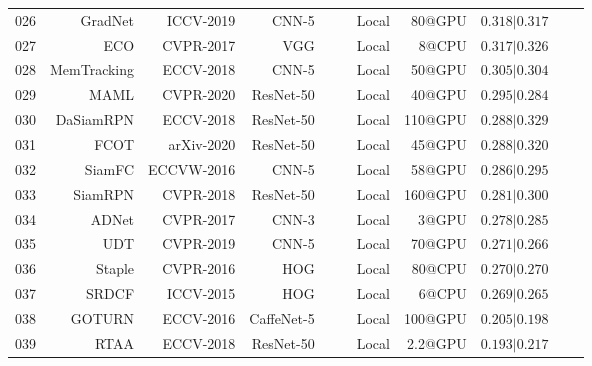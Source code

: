 \documentclass[final]{cvpr}
\begin{document}
\begin{table*}[!htp]
\begin{tabular}{rrrrccrrccc}
026			&GradNet		 \cite{Li_2019_ICCV}							&ICCV-2019    	&CNN-5     			&\cmark     			&\cmark    	&Local    		 		&80@GPU   				&$0.318|0.317$		 	\\
027			&ECO				 \cite{Danelljan2016ECO}					&CVPR-2017    	&VGG     			&\cmark     			&\xmark    	&Local    		 		&8@CPU    	 				&$0.317|0.326$		 	\\
028			&MemTracking \cite{Yang_2018_ECCV}					&ECCV-2018    	&CNN-5     			&\cmark     			&\cmark    	&Local    		 		&50@GPU    	 			&$0.305|0.304$		 	\\
029			&MAML			 \cite{wang2020MAML}						&CVPR-2020    	&ResNet-50     	&\xmark     			&\cmark    	&Local    		 		&40@GPU    	 			&$0.295|0.284$		 	\\
030			&DaSiamRPN	 \cite{zhu2018distractor}						&ECCV-2018    	&ResNet-50     	&\xmark     			&\cmark    	&Local    		 		&110@GPU    	 			&$0.288|0.329$		 	\\
031			&FCOT			 \cite{cui2020FCOT}							&arXiv-2020    	&ResNet-50     	&\xmark     			&\cmark    	&Local    		 		&45@GPU    	 			&$0.288|0.320$		 	\\
032			&SiamFC		 	 \cite{bertinetto2016siamfc}					&ECCVW-2016   &CNN-5     			&\xmark     			&\cmark    	&Local    		 		&58@GPU    	 			&$0.286|0.295$		 	\\
033			&SiamRPN		 \cite{li2018siamRPN}							&CVPR-2018    	&ResNet-50     	&\xmark     			&\cmark    	&Local    		 		&160@GPU    	 			&$0.281|0.300$		 	\\
034			&ADNet			 \cite{Yun2017ADNet}							&CVPR-2017    	&CNN-3     			&\cmark     			&\cmark    	&Local    		 		&3@GPU    	 				&$0.278|0.285$		 	\\
035			&UDT				 \cite{wang2019UDT}							&CVPR-2019    	&CNN-5     			&\xmark     			&\cmark   	&Local    		 		&70@GPU    	 			&$0.271|0.266$		 	\\
036			&Staple			 \cite{bertinetto2016staple}					&CVPR-2016    	&HOG     			&\cmark     			&\xmark    	&Local    		 		&80@CPU    	 			&$0.270|0.270$		 	\\
037			&SRDCF		 	 \cite{danelljan2015srdcf}					&ICCV-2015    	&HOG     			&\cmark     			&\xmark    	&Local    		 		&6@CPU    	 				&$0.269|0.265$		 	\\
038			&GOTURN		 \cite{held2016GOTURN}					&ECCV-2016    	&CaffeNet-5     	&\xmark     			&\cmark    	&Local    		 		&100@GPU    	 			&$0.205|0.198$		 	\\
039			&RTAA			 \cite{jia2020TrackAttack}					&ECCV-2018    	&ResNet-50     	&\xmark     			&\cmark    	&Local    		 		&2.2@GPU    	 			&$0.193|0.217$		 	\\

\end{tabular}
\end{table*}
\end{document}
